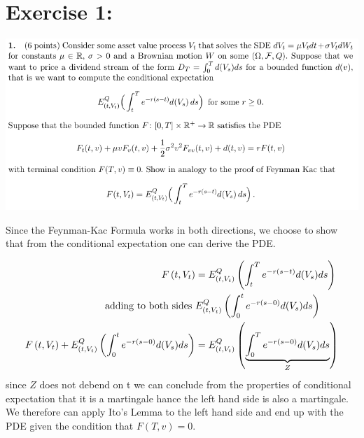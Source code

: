 \documentclass[document.tex]{subfiles}
\begin{document}
\section*{Exercise 1:}

\includegraphics[width=\textwidth]{ex1.png}

Since the Feynman-Kac Formula works in both directions,
we choose to show that from the conditional expectation one can
derive the PDE.

\begin{align*}
	F \left( t, V_t \right) &= E^Q_{\left( t, V_t \right)} \left( \int_t^T e^{-r(s-t)} d(V_s) ds \right) \\
	\text{adding to both sides } & E^Q_{\left( t, V_t \right)} \left( \int_0^t e^{-r(s-0)} d(V_s) ds \right)\\
F \left( t, V_t \right) + E^Q_{\left( t, V_t \right)} \left( \int_0^t e^{-r(s-0)} d(V_s) ds \right) &=
E^Q_{\left( t, V_t \right)} \left( \underbrace{\int_0^T e^{-r(s-0)} d(V_s) ds}_{Z} \right) 
\end{align*}
since $Z$ does not debend on t we can conclude from the properties of conditional expectation that
it is a martingale hance the left hand side is also a martingale.
We therefore can apply Ito's Lemma to the left hand side and end up with the PDE given the condition
that $F(T,v)=0$.
\end{document}
